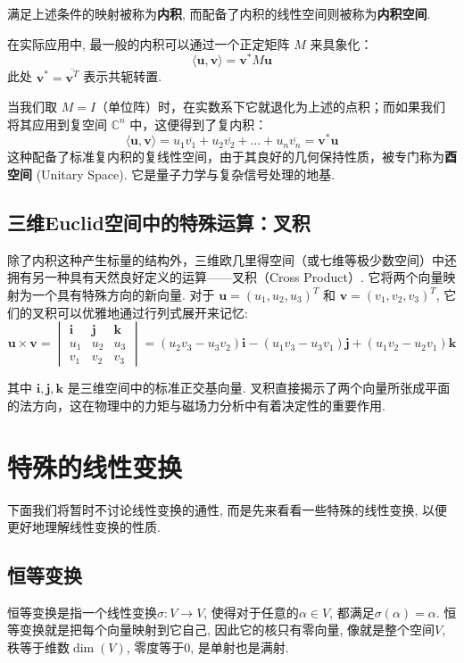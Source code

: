 \documentclass{ctexart}
\begin{document}
满足上述条件的映射被称为\textbf{内积}, 而配备了内积的线性空间则被称为\textbf{内积空间}.

在实际应用中, 最一般的内积可以通过一个正定矩阵 $M$ 来具象化：
$$ \langle \mathbf{u}, \mathbf{v} \rangle = \mathbf{v}^* M \mathbf{u} $$
此处 $\mathbf{v}^* = \overline{\mathbf{v}^T}$ 表示共轭转置.

当我们取 $M=I$（单位阵）时，在实数系下它就退化为上述的点积；而如果我们将其应用到复空间 $\mathbb{C}^n$ 中，这便得到了复内积：
$$ \langle \mathbf{u}, \mathbf{v} \rangle = u_1 \overline{v_1} + u_2 \overline{v_2} + \ldots + u_n \overline{v_n} = \mathbf{v}^* \mathbf{u} $$
这种配备了标准复内积的复线性空间，由于其良好的几何保持性质，被专门称为\textbf{酉空间} (Unitary Space). 它是量子力学与复杂信号处理的地基. 

\subsection{三维Euclid空间中的特殊运算：叉积}

除了内积这种产生标量的结构外，三维欧几里得空间（或七维等极少数空间）中还拥有另一种具有天然良好定义的运算——叉积（Cross Product）. 
它将两个向量映射为一个具有特殊方向的新向量. 
对于 $\mathbf{u} = (u_1, u_2, u_3)^T$ 和 $\mathbf{v} = (v_1, v_2, v_3)^T$, 它们的叉积可以优雅地通过行列式展开来记忆:
$$
\mathbf{u} \times \mathbf{v} = \begin{vmatrix}
\mathbf{i} & \mathbf{j} & \mathbf{k} \\
u_1 & u_2 & u_3 \\
v_1 & v_2 & v_3
\end{vmatrix} = (u_2 v_3 - u_3 v_2) \mathbf{i} - (u_1 v_3 - u_3 v_1) \mathbf{j} + (u_1 v_2 - u_2 v_1) \mathbf{k}
$$

其中 $\mathbf{i}, \mathbf{j}, \mathbf{k}$ 是三维空间中的标准正交基向量. 叉积直接揭示了两个向量所张成平面的法方向，这在物理中的力矩与磁场力分析中有着决定性的重要作用.

\section{特殊的线性变换}

下面我们将暂时不讨论线性变换的通性, 而是先来看看一些特殊的线性变换, 以便更好地理解线性变换的性质.

\subsection{恒等变换}

恒等变换是指一个线性变换$\sigma: V \to V$, 使得对于任意的$\alpha \in V$, 都满足$\sigma(\alpha) = \alpha$. 恒等变换就是把每个向量映射到它自己, 因此它的核只有零向量, 像就是整个空间$V$, 秩等于维数$\dim(V)$, 零度等于0, 是单射也是满射.
\end{document}
